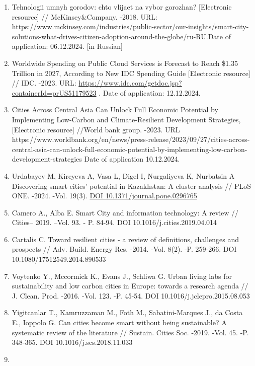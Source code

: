 \begin{enumerate}
\def\labelenumi{\arabic{enumi}.}
\item
  Tehnologii umnyh gorodov: chto vlijaet na vybor gorozhan?
  {[}Electronic resource{]} // McKinsey\&Company. -2018. URL:
  https://www.mckinsey.com/industries/public-sector/our-insights/smart-city-solutions-what-drives-citizen-adoption-around-the-globe/ru-RU.Date
  of application: 06.12.2024. {[}in Russian{]}
\item
  Worldwide Spending on Public Cloud Services is Forecast to Reach
  \$1.35 Trillion in 2027, According to New IDC Spending Guide
  {[}Electronic resource{]} // IDC. -2023. URL:
  \url{https://www.idc.com/getdoc.jsp?containerId=prUS51179523} . Date
  of application: 12.12.2024.
\item
  Cities Across Central Asia Can Unlock Full Economic Potential by
  Implementing Low-Carbon and Climate-Resilient Development Strategies,
  {[}Electronic resource{]} //World bank group. -2023. URL
  https://www.worldbank.org/en/news/press-release/2023/09/27/cities-across-central-asia-can-unlock-full-economic-potential-by-implementing-low-carbon-development-strategies
  Date of application 10.12.2024.
\item
  Urdabayev M, Kireyeva A, Vasa L, Digel I, Nurgaliyeva K, Nurbatsin A
  Discovering smart cities' potential in Kazakhstan: A cluster analysis
  // PLoS ONE. -2024. -Vol. 19(3).
  \href{https://doi.org/10.1371/journal.pone.0296765}{DOI
  10.1371/journal.pone.0296765}
\item
  Camero A., Alba E. Smart City and information technology: A review //
  Cities-- 2019. --Vol. 93. - P. 84-94. DOI 10.1016/j.cities.2019.04.014
\item
  Cartalis C. Toward resilient cities - a review of definitions,
  challenges and prospects // Adv. Build. Energy Res. -2014. -Vol. 8(2).
  -P. 259-266. DOI 10.1080/17512549.2014.890533
\item
  Voytenko Y., Mccormick K., Evans J., Schliwa G. Urban living labs for
  sustainability and low carbon cities in Europe: towards a research
  agenda // J. Clean. Prod. -2016. -Vol. 123. -P. 45-54. DOI
  10.1016/j.jclepro.2015.08.053
\item
  Yigitcanlar T., Kamruzzaman M., Foth M., Sabatini-Marques J., da Costa
  E., Ioppolo G. Can cities become smart without being sustainable? A
  systematic review of the literature // Sustain. Cities Soc. -2019.
  -Vol. 45. -P. 348-365. DOI 10.1016/j.scs.2018.11.033
\item

\end{enumerate}
